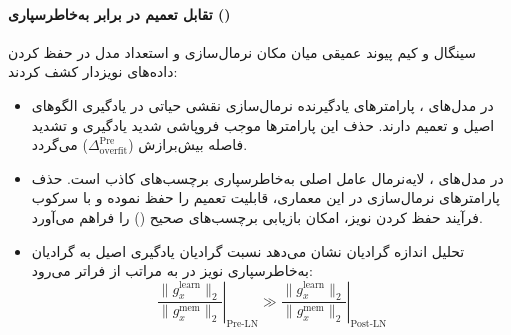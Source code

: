 \paragraph*{تقابل تعمیم در برابر به‌خاطرسپاری () \cite{singhal2025impact}}
سینگال و کیم پیوند عمیقی میان مکان نرمال‌سازی و استعداد مدل در حفظ کردن داده‌های نویزدار کشف کردند:
\begin{itemize}
    \item در مدل‌های ، پارامترهای یادگیرنده نرمال‌سازی نقشی حیاتی در یادگیری الگوهای اصیل و تعمیم دارند. حذف این پارامترها موجب فروپاشی شدید یادگیری و تشدید فاصله بیش‌برازش ($\Delta_{\text{overfit}}^{\text{Pre}}$) می‌گردد.
    \item در مدل‌های ، لایه‌نرمال عامل اصلی به‌خاطرسپاری برچسب‌های کاذب است. حذف پارامترهای نرمال‌سازی در این معماری، قابلیت تعمیم را حفظ نموده و با سرکوب فرآیند حفظ کردن نویز، امکان بازیابی برچسب‌های صحیح () را فراهم می‌آورد.
    \item تحلیل اندازه گرادیان نشان می‌دهد نسبت گرادیان یادگیری اصیل به گرادیان به‌خاطرسپاری نویز در  به مراتب از  فراتر می‌رود:
    \begin{equation}
        \left. \frac{\|g_x^{\text{learn}}\|_2}{\|g_x^{\text{mem}}\|_2} \right|_{\text{Pre-LN}} \gg \left. \frac{\|g_x^{\text{learn}}\|_2}{\|g_x^{\text{mem}}\|_2} \right|_{\text{Post-LN}}
    \end{equation}
\end{itemize}

